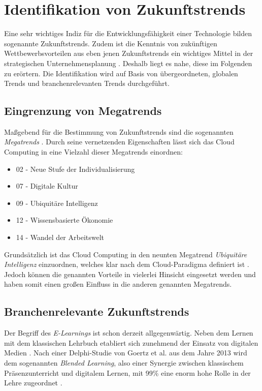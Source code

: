 \section{Identifikation von Zukunftstrends}
\label{futuretrends}

Eine sehr wichtiges Indiz für die Entwicklungsfähigkeit einer Technologie bilden sogenannte Zukunftstrends. Zudem ist die Kenntnis von zukünftigen Wettbewerbsvorteilen aus eben jenen Zukunftstrends ein wichtiges Mittel in der strategischen Unternehmensplanung \cite{mietzner}. Deshalb liegt es nahe, diese im Folgenden zu erörtern. Die Identifikation wird auf Basis von übergeordneten, globalen  Trends und branchenrelevanten Trends durchgeführt.

\subsection{Eingrenzung von Megatrends}

Maßgebend für die Bestimmung von Zukunftstrends sind die sogenannten \textit{Megatrends} \cite{zpunkt}. Durch seine vernetzenden Eigenschaften lässt sich das Cloud Computing in eine Vielzahl dieser Megatrends einordnen:

\begin{itemize}
	\item 02 - Neue Stufe der Individualisierung
	\item 07 - Digitale Kultur
	\item 09 - Ubiquitäre Intelligenz
	\item 12 - Wissensbasierte Ökonomie
	\item 14 - Wandel der Arbeitswelt 
\end{itemize}

Grundsätzlich ist das Cloud Computing in den neunten Megatrend \textit{Ubiquitäre Intelligenz} einzuordnen, welches klar nach dem Cloud-Paradigma definiert ist \cite{zpunkt}. Jedoch können die genannten Vorteile in vielerlei Hinsicht eingesetzt werden und haben somit einen großen Einfluss in die anderen genannten Megatrends.

\subsection{Branchenrelevante Zukunftstrends}

Der Begriff des \textit{E-Learnings} ist schon derzeit allgegenwärtig. Neben dem Lernen mit dem klassischen Lehrbuch etabliert sich zunehmend der Einsatz von digitalen Medien \cite{meinel2}. Nach einer Delphi-Studie von Goertz et al. aus dem Jahre 2013 wird dem sogenannten \textit{Blended Learning}, also einer Synergie zwischen klassischem Präsenzunterricht und digitalem Lernen, mit 99\% eine enorm hohe Rolle in der Lehre zugeordnet \cite{goertz}.

